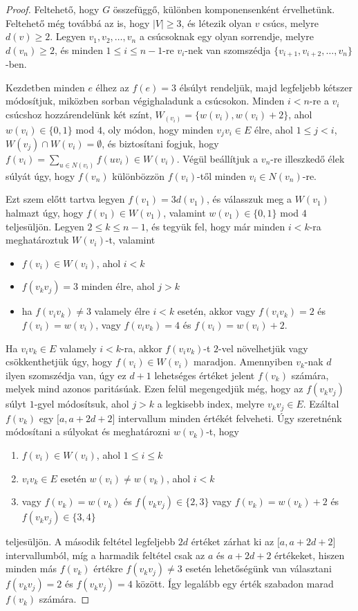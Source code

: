 \documentclass[12pt, a4paper]{report}
\theoremstyle{remark}
\theoremstyle{definition}
\begin{document}
\begin{proof}
Feltehető, hogy $G$ összefüggő, különben komponensenként érvelhetünk. Feltehető még továbbá az is, hogy $|V| \geq 3$, és létezik olyan $v$ csúcs, melyre $d(v) \geq 2$. Legyen $v_1, v_2, \ldots, v_n$ a csúcsoknak egy olyan sorrendje, melyre $d(v_n) \geq 2$, és minden $1 \leq i \leq n-1$-re $v_i$-nek van szomszédja $\lbrace v_{i+1}, v_{i+2}, \ldots, v_n \rbrace$-ben.

Kezdetben minden $e$ élhez az $f(e) = 3$ élsúlyt rendeljük, majd legfeljebb kétszer módosítjuk, miközben sorban végighaladunk a csúcsokon. Minden $i < n$-re a $v_i$ csúcshoz hozzárendelünk két színt, $W_(v_i) = \lbrace w(v_i), w(v_i) +2 \rbrace$, ahol $w(v_i) \in \lbrace 0, 1 \rbrace$ mod $4$, oly módon, hogy minden $v_j v_i \in E$ élre, ahol $1 \leq j < i$, $W(v_j) \cap W(v_i) = \emptyset$, és biztosítani fogjuk, hogy $f(v_i) = \sum\limits_{u \in N(v_i)} f(uv_i) \in W(v_i)$. Végül beállítjuk a $v_n$-re illeszkedő élek súlyát úgy, hogy $f(v_n)$ különbözzön $f(v_i)$-től minden $v_i \in N(v_n)$-re.

Ezt szem előtt tartva legyen $f(v_1) = 3d(v_1)$, és válasszuk meg a $W(v_1)$ halmazt úgy, hogy $f(v_1) \in W(v_1)$, valamint $w(v_1) \in \lbrace 0, 1 \rbrace$ mod $4$ teljesüljön. Legyen $2 \leq k \leq n - 1$, és tegyük fel, hogy már minden $i < k$-ra meghatároztuk $W(v_i)$-t, valamint
\begin{itemize}
\item $f(v_i) \in W(v_i)$, ahol $i < k$
\item $f(v_k v_j) = 3$ minden élre, ahol $j > k$
\item ha $f(v_i v_k) \neq 3$ valamely élre $i < k$ esetén, akkor vagy $f(v_i v_k) = 2$ és $f(v_i) = w(v_i)$, vagy $f(v_i v_k) = 4$ és $f(v_i) = w(v_i) + 2$.
\end{itemize}

Ha $v_i v_k \in E$ valamely $i < k$-ra, akkor $f(v_i v_k)$-t $2$-vel növelhetjük vagy csökkenthetjük úgy, hogy $f(v_i) \in W(v_i)$ maradjon. Amennyiben $v_k$-nak $d$ ilyen szomszédja van, úgy ez $d + 1$ lehetséges értéket jelent $f(v_k)$ számára, melyek mind azonos paritásúak. Ezen felül megengedjük még, hogy az $f(v_k v_j)$ súlyt $1$-gyel módosítsuk, ahol $j > k$ a legkisebb index, melyre $v_k v_j \in E$. Ezáltal $f(v_k)$ egy $\lbrack a, a + 2d + 2 \rbrack$ intervallum minden értékét felveheti. Úgy szeretnénk módosítani a súlyokat és meghatározni $w(v_k)$-t, hogy
\begin{enumerate}
\item $f(v_i) \in W(v_i)$, ahol $1 \leq i \leq k$
\item $v_i v_k \in E$ esetén $w(v_i) \neq w(v_k)$, ahol $i < k$
\item vagy $f(v_k) = w(v_k)$ és $f(v_k v_j) \in \lbrace 2, 3 \rbrace$ vagy $f(v_k) = w(v_k) + 2$ és $f(v_k v_j) \in \lbrace 3, 4 \rbrace$
\end{enumerate}
teljesüljön. A második feltétel legfeljebb $2d$ értéket zárhat ki az $\lbrack a, a + 2d + 2 \rbrack$ intervallumból, míg a harmadik feltétel csak az $a$ és $a + 2d + 2$ értékeket, hiszen minden más $f(v_k)$ értékre $f(v_k v_j) \neq 3$ esetén lehetőségünk van választani $f(v_k v_j) = 2$ és $f(v_k v_j) = 4$ között. Így legalább egy érték szabadon marad $f(v_k)$ számára.


\end{proof}
\end{document}
